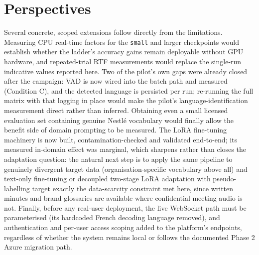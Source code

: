 \documentclass[12pt]{report}
\begin{document}
\section*{Perspectives}
Several concrete, scoped extensions follow directly from the limitations. Measuring CPU real-time factors for the \texttt{small} and larger checkpoints would establish whether the ladder's accuracy gains remain deployable without GPU hardware, and repeated-trial RTF measurements would replace the single-run indicative values reported here. Two of the pilot's own gaps were already closed after the campaign: VAD is now wired into the batch path and measured (Condition C), and the detected language is persisted per run; re-running the full matrix with that logging in place would make the pilot's language-identification measurement direct rather than inferred. Obtaining even a small licensed evaluation set containing genuine Nestl\'e vocabulary would finally allow the benefit side of domain prompting to be measured. The LoRA fine-tuning machinery is now built, contamination-checked and validated end-to-end; its measured in-domain effect was marginal, which sharpens rather than closes the adaptation question: the natural next step is to apply the same pipeline to genuinely divergent target data (organisation-specific vocabulary above all) and text-only fine-tuning \cite{fang2025textonly} or decoupled two-stage LoRA adaptation with pseudo-labelling \cite{zheng2026twostage} target exactly the data-scarcity constraint met here, since written minutes and brand glossaries are available where confidential meeting audio is not. Finally, before any real-user deployment, the live WebSocket path must be parameterised (its hardcoded French decoding language removed), and authentication and per-user access scoping added to the platform's endpoints, regardless of whether the system remains local or follows the documented Phase 2 Azure migration path.
\renewcommand{\cftchappresnum}{\chaptername~}
\renewcommand{\cftchapnumwidth}{6em}
\cleardoublepage
\printbibliography[heading=subbibliography,
                    title={\textsc{Bibliography}}]
\thispagestyle{fancy}
\newpage
\tableofcontents
\thispagestyle{fancy}
\end{document}
